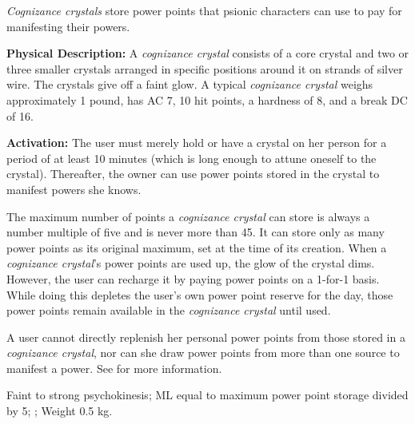 \emph{Cognizance crystals} store power points that psionic characters can use to pay for manifesting their powers.


\textbf{Physical Description:} A \emph{cognizance crystal} consists of a core crystal and two or three smaller crystals arranged in specific positions around it on strands of silver wire. The crystals give off a faint glow. A typical \emph{cognizance crystal} weighs approximately 1 pound, has AC 7, 10 hit points, a hardness of 8, and a break DC of 16.

\textbf{Activation:} The user must merely hold or have a crystal on her person for a period of at least 10 minutes (which is long enough to attune oneself to the crystal). Thereafter, the owner can use power points stored in the crystal to manifest powers she knows.

The maximum number of points a \emph{cognizance crystal} can store is always a number multiple of five and is never more than 45. It can store only as many power points as its original maximum, set at the time of its creation. When a \emph{cognizance crystal}'s power points are used up, the glow of the crystal dims. However, the user can recharge it by paying power points on a 1-for-1 basis. While doing this depletes the user's own power point reserve for the day, those power points remain available in the \emph{cognizance crystal} until used.

A user cannot directly replenish her personal power points from those stored in a \emph{cognizance crystal}, nor can she draw power points from more than one source to manifest a power. See  for more information.

Faint to strong psychokinesis; ML equal to maximum power point storage divided by 5; ; Weight 0.5 kg.
